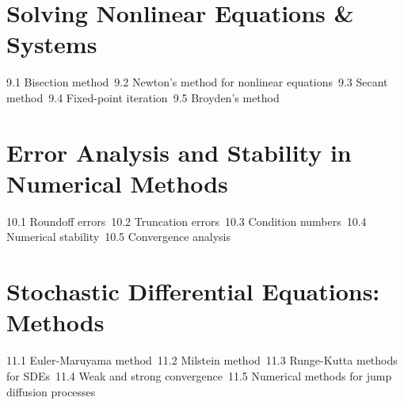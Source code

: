 \section{Solving Nonlinear Equations \& Systems}
9.1 Bisection method\
9.2 Newton's method for nonlinear equations\
9.3 Secant method\
9.4 Fixed-point iteration\
9.5 Broyden's method\
\section{Error Analysis and Stability in Numerical Methods}
10.1 Roundoff errors\
10.2 Truncation errors\
10.3 Condition numbers\
10.4 Numerical stability\
10.5 Convergence analysis\
\section{Stochastic Differential Equations: Methods}
11.1 Euler-Maruyama method\
11.2 Milstein method\
11.3 Runge-Kutta methods for SDEs\
11.4 Weak and strong convergence\
11.5 Numerical methods for jump diffusion processes\
